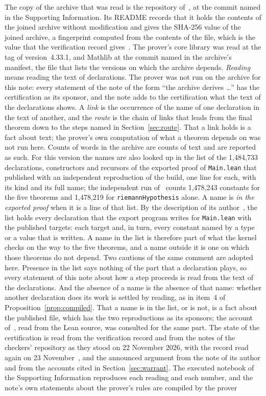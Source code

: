 \documentclass[11pt]{article}
\theoremstyle{definition}
\theoremstyle{remark}
\DeclareRobustCommand{\lean}[1]{{\renewcommand{\_}{\textunderscore\allowbreak}\texttt{#1}}}
\begin{document}
The copy of the archive that was read is the repository of~\citet{mirror}, at the commit named in the Supporting Information. Its README records that it holds the contents of the joined archive without modification and gives the SHA-256 value of the joined archive, a fingerprint computed from the contents of the file, which is the value that the verification record gives~\citep{sutherland}. The prover's core library was read at the tag of version~4.33.1, and Mathlib at the commit named in the archive's manifest, the file that lists the versions on which the archive depends. \emph{Reading} means reading the text of declarations. The prover was not run on the archive for this note: every statement of the note of the form ``the archive derives \dots'' has the certification as its sponsor, and the note adds to the certification what the text of the declarations shows. A \emph{link} is the occurrence of the name of one declaration in the text of another, and the \emph{route} is the chain of links that leads from the final theorem down to the steps named in Section~\ref{sec:route}. That a link holds is a fact about text; the prover's own computation of what a theorem depends on was not run here. Counts of words in the archive are counts of text and are reported as such. For this version the names are also looked up in the list of the 1{,}484{,}733 declarations, constructors and recursors of the exported proof of \lean{Main.lean} that~\citet{dixit} published with an independent reproduction of the build, one line for each, with its kind and its full name; the independent run of~\citet{lipponen} counts 1{,}478{,}243 constants for the five theorems and 1{,}478{,}219 for \lean{riemannHypothesis} alone. A name is \emph{in the exported proof} when it is a line of that list. By the description of its author~\citep{dixitcomment}, the list holds every declaration that the export program writes for \lean{Main.lean} with the published targets: each target and, in turn, every constant named by a type or a value that is written. A name in the list is therefore part of what the kernel checks on the way to the five theorems, and a name outside it is one on which those theorems do not depend. Two cautions of the same comment are adopted here. Presence in the list says nothing of the part that a declaration plays, so every statement of this note about how a step proceeds is read from the text of the declarations. And the absence of a name is the absence of that name: whether another declaration does its work is settled by reading, as in item~4 of Proposition~\ref{prop:compiled}. That a name is in the list, or is not, is a fact about the published file, which has the two reproductions as its sponsors; the account of~\citet{vincit}, read from the Lean source, was consulted for the same part. The state of the certification is read from the verification record and from the notes of the checkers' repository as they stood on 22 November 2026, with the record read again on 23 November~\citep{sutherland,leannotes}, and the announced argument from the note of its author and from the accounts cited in Section~\ref{sec:warrant}. The executed notebook of the Supporting Information reproduces each reading and each number, and the note's own statements about the prover's rules are compiled by the prover 
\end{document}
